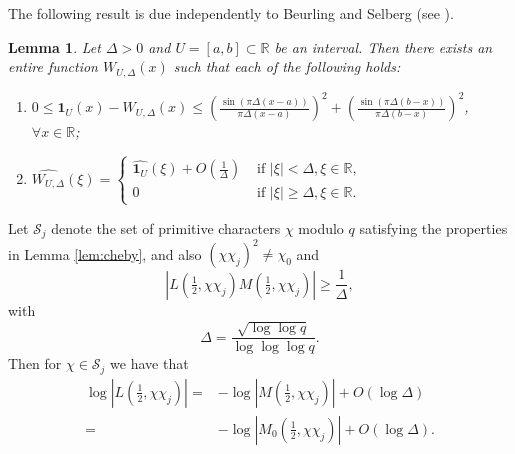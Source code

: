 \documentclass[12pt, reqno]{amsart}
\newtheorem{lemma}[theorem]{Lemma}
\numberwithin{equation}{section}
\numberwithin{theorem}{section}
\numberwithin{equation}{section}
\begin{document}
The following result is due independently to Beurling and Selberg (see \cite{V}).

\begin{lemma}\label{lem:BS}
Let $\Delta>0$ and $U=[a,b] \subset \mathbb R$ be an interval. Then there exists an entire function $W_{U,\Delta}(x)$ such that each of the following holds:
\begin{enumerate}
    \item $\displaystyle 0 \le \mathbf{1}_{U}(x)- W_{U,\Delta}(x) \le \left( \frac{\sin(\pi \Delta(x-a)) }{\pi \Delta (x-a)} \right)^2+\left( \frac{\sin(\pi \Delta(b-x)) }{\pi \Delta (b-x)} \right)^2$, $\forall x \in \mathbb R$;
    \item $ \displaystyle \widehat {W_{U,\Delta}}(\xi) =\begin{cases}
    \widehat {\mathbf{1}_{U}}(\xi)+O\left(\frac{1}{\Delta} \right) & \text{ if } |\xi| < \Delta, \xi \in \mathbb R, \\
    0 & \text{ if } |\xi| \ge \Delta, \xi \in \mathbb R.
    \end{cases}$
\end{enumerate}
\end{lemma}

Let $\mathcal{S}_j$ denote the set of primitive characters $\chi$ modulo $q$ satisfying the properties in Lemma \ref{lem:cheby},  
and also $(\chi \chi_j)^2 \neq \chi_0$  and
\[
|L(\tfrac12,\chi\chi_j)M(\tfrac12,\chi\chi_j)|\ge \frac{1}{\Delta},
\]
with 
$$\Delta= \frac{ \sqrt{\log \log q}}{\log\log \log q}.$$ Then for $\chi \in \mathcal{S}_j$ we have that
\begin{align}
\log|L(\tfrac12,\chi\chi_j)|=&- \log |M(\tfrac12,\chi\chi_j)|+O(\log \Delta) \nonumber  \\
=& -\log |M_0(\tfrac12,\chi\chi_j)|+O(\log \Delta). \label{lm}
\end{align}
\end{document}
